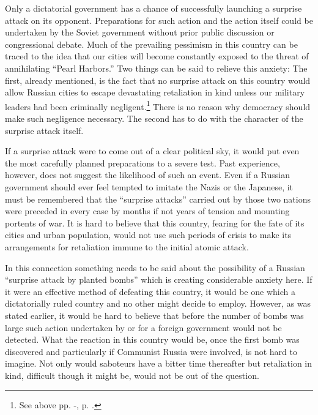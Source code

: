 Only a dictatorial government has a chance of successfully launching a surprise attack on its opponent. Preparations for such action and the action itself could be undertaken by the Soviet government without prior public discussion or congressional debate. Much of the prevailing pessimism in this country can be traced to the idea that our cities will become constantly exposed to the threat of annihilating ``Pearl Harbors.'' Two things can be said to relieve this anxiety: The first, already mentioned, is the fact that no surprise attack on this country would allow Russian cities to escape devastating retaliation in kind unless our military leaders had been criminally negligent.\footnote{See above pp. \pageref{II-Retaliation1}-\pageref{II-Retaliation2}, p. \pageref{II-Retaliation3}.} There is no reason why democracy should make such negligence necessary. The second has to do with the character of the surprise attack itself.

If a surprise attack were to come out of a clear political sky, it would put even the most carefully planned preparations to a severe test. Past experience, however, does not suggest the likelihood of such an event. Even if a Russian government should ever feel tempted to imitate the Nazis or the Japanese, it must be remembered that the ``surprise attacks'' carried out by those two nations were preceded in every case by months if not years of tension and mounting portents of war. It is hard to believe that this country, fearing for the fate of its cities and urban population, would not use such periods of crisis to make its arrangements for retaliation immune to the initial atomic attack.

In this connection something needs to be said about the possibility of a Russian ``surprise attack by planted bombs'' which is creating considerable anxiety here. If it were an effective method of defeating this country, it would be one which a dictatorially ruled country and no other might decide to employ. However, as was stated earlier, it would be hard to believe that before the number of bombs was large such action undertaken by or for a foreign government would not be detected. What the reaction in this country would be, once the first bomb was discovered and particularly if Communist Russia were involved, is not hard to imagine. Not only would saboteurs have a bitter time thereafter but retaliation in kind, difficult though it might be, would not be out of the question.

